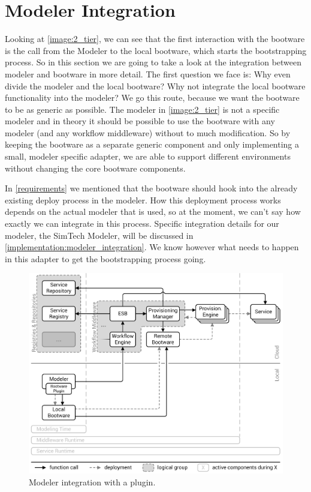 \section{Modeler Integration}
\label{design:modeler_integration}

Looking at \autoref{image:2_tier}, we can see that the first interaction with the bootware is the call from the Modeler to the local bootware, which starts the bootstrapping process.
So in this section we are going to take a look at the integration between modeler and bootware in more detail.
The first question we face is: Why even divide the modeler and the local bootware?
Why not integrate the local bootware functionality into the modeler?
We go this route, because we want the bootware to be as generic as possible.
The modeler in \autoref{image:2_tier} is not a specific modeler and in theory it should be possible to use the bootware with any modeler (and any workflow middleware) without to much modification.
So by keeping the bootware as a separate generic component and only implementing a small, modeler specific adapter, we are able to support different environments without changing the core bootware components.

In \autoref{requirements} we mentioned that the bootware should hook into the already existing deploy process in the modeler.
How this deployment process works depends on the actual modeler that is used, so at the moment, we can't say how exactly we can integrate in this process.
Specific integration details for our modeler, the SimTech Modeler, will be discussed in \autoref{implementation:modeler_integration}.
We know however what needs to happen in this adapter to get the bootstrapping process going.

\begin{figure}[!htbp]
	\centering
	\includegraphics[resolution=600]{design/assets/modeler_plugin}
	\caption{Modeler integration with a plugin.}
	\label{image:modeler_plugin}
\end{figure}

